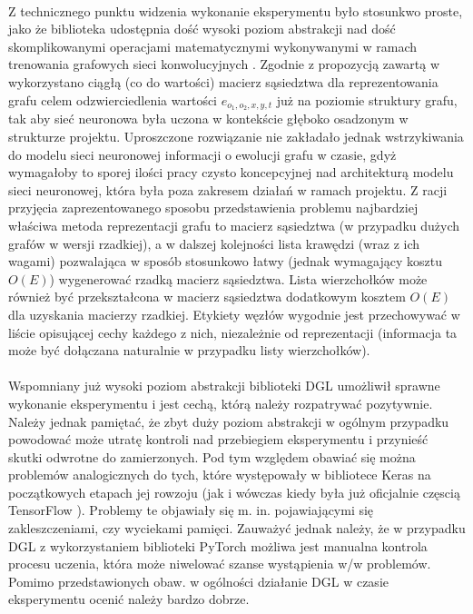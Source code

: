 \documentclass{article}
\begin{document}
\paragraph{}
Z technicznego punktu widzenia wykonanie eksperymentu było stosunkwo proste, jako że biblioteka udostępnia dość wysoki poziom abstrakcji nad dość skomplikowanymi operacjami matematycznymi wykonywanymi w ramach trenowania grafowych sieci konwolucyjnych \cite{gcn}. Zgodnie z propozycją zawartą w \cite{gcn} wykorzystano ciągłą (co do wartości) macierz sąsiedztwa dla reprezentowania grafu celem odzwierciedlenia wartości $e_{o_1, o_2, x, y, t}$ już na poziomie struktury grafu, tak aby sieć neuronowa była uczona w kontekście głęboko osadzonym w strukturze projektu. Uproszczone rozwiązanie nie zakładało jednak wstrzykiwania do modelu sieci neuronowej informacji o ewolucji grafu w czasie, gdyż wymagałoby to sporej ilości pracy czysto koncepcyjnej nad architekturą modelu sieci neuronowej, która była poza zakresem działań w ramach projektu. Z racji przyjęcia zaprezentowanego sposobu przedstawienia problemu najbardziej właściwa metoda reprezentacji grafu to macierz sąsiedztwa (w przypadku dużych grafów w wersji rzadkiej), a w dalszej kolejności lista krawędzi (wraz z ich wagami) pozwalająca w sposób stosunkowo łatwy (jednak wymagający kosztu $O(E)$) wygenerować rzadką macierz sąsiedztwa. Lista wierzchołków może również być przekształcona w macierz sąsiedztwa dodatkowym kosztem $O(E)$ dla uzyskania macierzy rzadkiej. Etykiety węzłów wygodnie jest przechowywać w liście opisującej cechy każdego z nich, niezależnie od reprezentacji (informacja ta może być dołączana naturalnie w przypadku listy wierzchołków).

\paragraph{}
Wspomniany już wysoki poziom abstrakcji biblioteki DGL \cite{dgl} umożliwił sprawne wykonanie eksperymentu i jest cechą, którą należy rozpatrywać pozytywnie. Należy jednak pamiętać, że zbyt duży poziom abstrakcji w ogólnym przypadku powodować może utratę kontroli nad przebiegiem eksperymentu i przynieść skutki odwrotne do zamierzonych. Pod tym względem obawiać się można problemów analogicznych do tych, które występowały w bibliotece Keras \cite{keras} na początkowych etapach jej rowzoju (jak i wówczas kiedy była już oficjalnie częscią TensorFlow \cite{tf}). Problemy te objawiały się m. in. pojawiającymi się zakleszczeniami, czy wyciekami pamięci. Zauważyć jednak należy, że w przypadku DGL \cite{dgl} z wykorzystaniem biblioteki PyTorch \cite{torch} możliwa jest manualna kontrola procesu uczenia, która może niwelować szanse wystąpienia w/w problemów. Pomimo przedstawionych obaw. w ogólności działanie DGL \cite{dgl} w czasie eksperymentu ocenić należy bardzo dobrze.
\end{document}
